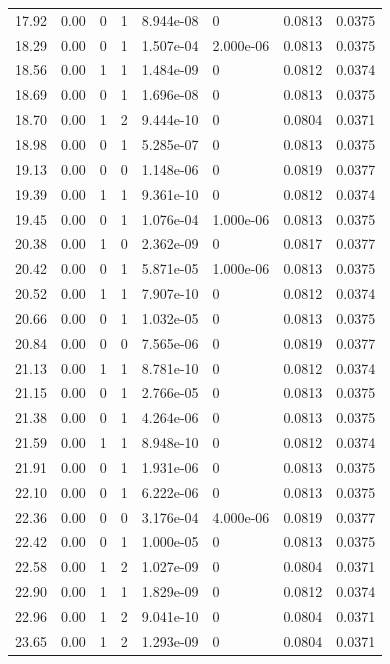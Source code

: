 \documentclass[preview]{standalone}
\begin{document}
{{{\begin{tabular}{L{1.2cm}C{1.2cm} C{0.3cm}C{0.5cm} C{1.4cm}C{1.4cm} C{1.4cm}C{1.4cm}}
  17.92  &  0.00  & 0     &  1 &  8.944e-08  & 0  & 0.0813 &  0.0375   \\ 
  18.29  &  0.00  & 0     &  1 &  1.507e-04  & 2.000e-06  & 0.0813 &  0.0375   \\ 
  18.56  &  0.00  & 1     &  1 &  1.484e-09  & 0  & 0.0812 &  0.0374   \\ 
  18.69  &  0.00  & 0     &  1 &  1.696e-08  & 0  & 0.0813 &  0.0375   \\ 
  18.70  &  0.00  & 1     &  2 &  9.444e-10  & 0  & 0.0804 &  0.0371   \\ 
  18.98  &  0.00  & 0     &  1 &  5.285e-07  & 0  & 0.0813 &  0.0375   \\ 
  19.13  &  0.00  & 0     &  0 &  1.148e-06  & 0  & 0.0819 &  0.0377   \\ 
  19.39  &  0.00  & 1     &  1 &  9.361e-10  & 0  & 0.0812 &  0.0374   \\ 
  19.45  &  0.00  & 0     &  1 &  1.076e-04  & 1.000e-06  & 0.0813 &  0.0375   \\ 
  20.38  &  0.00  & 1     &  0 &  2.362e-09  & 0  & 0.0817 &  0.0377   \\ 
  20.42  &  0.00  & 0     &  1 &  5.871e-05  & 1.000e-06  & 0.0813 &  0.0375   \\ 
  20.52  &  0.00  & 1     &  1 &  7.907e-10  & 0  & 0.0812 &  0.0374   \\ 
  20.66  &  0.00  & 0     &  1 &  1.032e-05  & 0  & 0.0813 &  0.0375   \\ 
  20.84  &  0.00  & 0     &  0 &  7.565e-06  & 0  & 0.0819 &  0.0377   \\ 
  21.13  &  0.00  & 1     &  1 &  8.781e-10  & 0  & 0.0812 &  0.0374   \\ 
  21.15  &  0.00  & 0     &  1 &  2.766e-05  & 0  & 0.0813 &  0.0375   \\ 
  21.38  &  0.00  & 0     &  1 &  4.264e-06  & 0  & 0.0813 &  0.0375   \\ 
  21.59  &  0.00  & 1     &  1 &  8.948e-10  & 0  & 0.0812 &  0.0374   \\ 
  21.91  &  0.00  & 0     &  1 &  1.931e-06  & 0  & 0.0813 &  0.0375   \\ 
  22.10  &  0.00  & 0     &  1 &  6.222e-06  & 0  & 0.0813 &  0.0375   \\ 
  22.36  &  0.00  & 0     &  0 &  3.176e-04  & 4.000e-06  & 0.0819 &  0.0377   \\ 
  22.42  &  0.00  & 0     &  1 &  1.000e-05  & 0  & 0.0813 &  0.0375   \\ 
  22.58  &  0.00  & 1     &  2 &  1.027e-09  & 0  & 0.0804 &  0.0371   \\ 
  22.90  &  0.00  & 1     &  1 &  1.829e-09  & 0  & 0.0812 &  0.0374   \\ 
  22.96  &  0.00  & 1     &  2 &  9.041e-10  & 0  & 0.0804 &  0.0371   \\ 
  23.65  &  0.00  & 1     &  2 &  1.293e-09  & 0  & 0.0804 &  0.0371   \\ 
\hline 
\end{tabular} 

}}}
\end{document}
